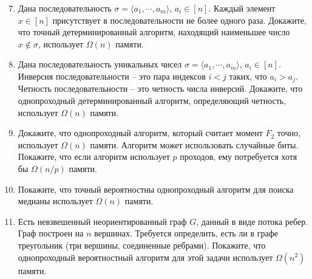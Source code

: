 \documentclass{article}
\begin{document}
\begin{enumerate}
    \setcounter{enumi}{6}
 
    \item Дана последовательность $\sigma = \langle a_1, \cdots, a_m \rangle$, $a_i \in [n]$. Каждый элемент $x \in [n]$ присутствует в последовательности не более одного раза. Докажите, что точный детерминированный алгоритм, находящий наименьшее число $x \not\in \sigma$, использует $\Omega(n)$ памяти.

    \item Дана последовательность уникальных чисел $\sigma = \langle a_1, \cdots, a_m \rangle$, $a_i \in [n]$. Инверсия последовательности -- это пара индексов $i < j$ таких, что $a_i > a_j$. Четность последовательности -- это четность числа инверсий. Докажите, что однопроходный детерминированный алгоритм, определяющий четность, использует $\Omega(n)$ памяти.

    \item Докажите, что однопроходный алгоритм, который считает момент $F_2$ точно, использует $\Omega(n)$ памяти. Алгоритм может использовать случайные биты. Покажите, что если алгоритм использует $p$ проходов, ему потребуется хотя бы $\Omega(n / p)$ памяти.

    \item Покажите, что точный вероятностны однопроходный алгоритм для поиска медианы использует $\Omega(n)$ памяти.

    \item Есть невзвешенный неориентированный граф $G$, данный в виде потока ребер. Граф построен на $n$ вершинах. Требуется определить, есть ли в графе треугольник (три вершины, соединенные ребрами). Покажите, что однопроходный вероятностный алгоритм для этой задачи использует $\Omega(n^2)$ памяти.
\end{enumerate}
\end{document}
